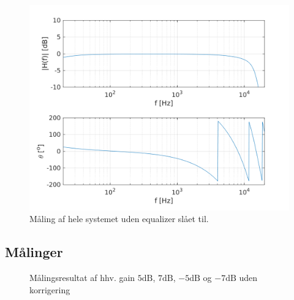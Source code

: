 \begin{figure}[h!]
	\centering
	\includegraphics[scale = 0.8]{matlabdemo/test/test_eq_off.png}  
	\caption{Måling af hele systemet uden equalizer slået til.}
	\label{fig:eq_off1}
\end{figure}

\subsection{Målinger}

\begin{figure}[h!]
	\centering
  	\caption{Målingsresultat af hhv. gain $5\si{\dB}$, $7\si{\dB}$, $-5\si{\dB}$ og $-7\si{\dB}$ uden korrigering}
	\label{fig:gain}
\end{figure}

